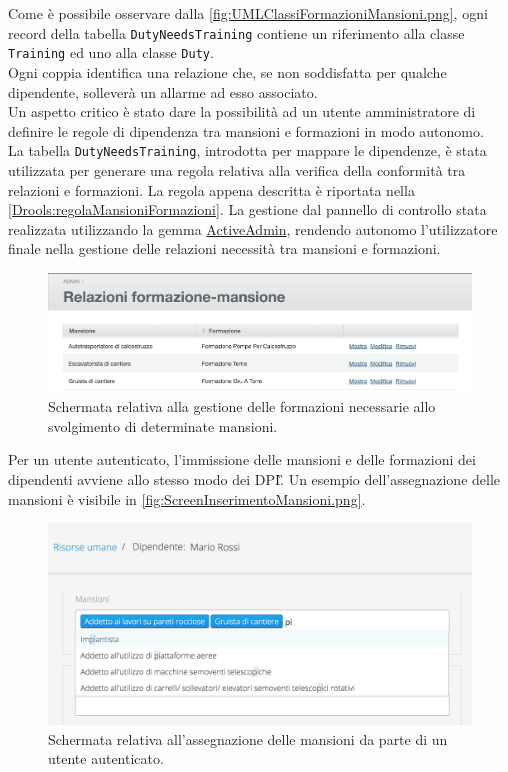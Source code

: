 Come è possibile osservare dalla \autoref{fig:UMLClassiFormazioniMansioni.png}, ogni record della tabella \texttt{DutyNeedsTraining} contiene un riferimento alla classe \texttt{Training} ed uno alla classe \texttt{Duty}.\\
Ogni coppia identifica una relazione che, se non soddisfatta per qualche dipendente, solleverà un allarme ad esso associato.\\
Un aspetto critico è stato dare la possibilità ad un utente amministratore di definire le regole di dipendenza tra mansioni e formazioni in modo autonomo. \\
La tabella \texttt{DutyNeedsTraining}, introdotta per mappare le dipendenze, è stata utilizzata per generare una regola relativa alla verifica della conformità tra relazioni e formazioni. La regola appena descritta è riportata nella \autoref{Drools:regolaMansioniFormazioni}.
La gestione dal pannello di controllo  stata realizzata utilizzando la gemma \hyperref[sec:ActiveAdmin]{ActiveAdmin}, rendendo  autonomo l'utilizzatore finale nella gestione delle relazioni necessità tra mansioni e formazioni.
\begin{figure}[H]
	\begin{center}
		\includegraphics[width=14cm]{Pics/ScreenFormazioneMansioneAdmin.png}
		\caption{Schermata relativa alla gestione delle formazioni necessarie allo svolgimento di determinate mansioni.}
		\label{fig:ScreenFormazioneMansioneAdmin.png}
	\end{center}
\end{figure}
Per un utente autenticato, l'immissione delle mansioni e delle formazioni dei dipendenti avviene allo stesso modo dei \gls{DPI}\G. Un esempio dell'assegnazione delle mansioni è visibile in  \autoref{fig:ScreenInserimentoMansioni.png}.
\begin{figure}[H]
	\begin{center}
		\includegraphics[width=14cm]{Pics/ScreenInserimentoMansioni.png}
		\caption{Schermata relativa all'assegnazione delle mansioni da parte di un utente autenticato.}
		\label{fig:ScreenInserimentoMansioni.png}
	\end{center}
\end{figure}
